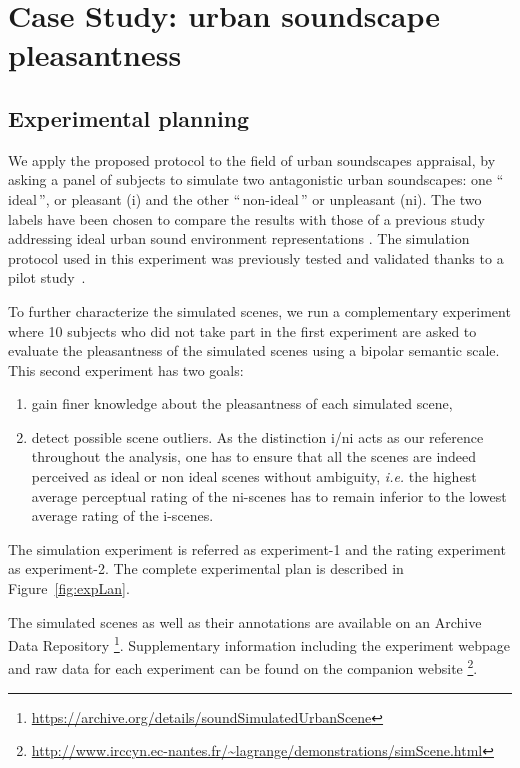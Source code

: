\documentclass[twoside,twocolumn]{article}
\begin{document}

\section{Case Study: urban soundscape pleasantness}
\label{sec:CaseStudyUrbanSoundscape}
\subsection{Experimental planning}

We apply the proposed protocol to the field of urban soundscapes appraisal, by asking a panel of subjects to simulate two antagonistic urban soundscapes:  one ``\,ideal\,'', or pleasant (i) and the other ``\,non-ideal\,'' or unpleasant (ni). The two labels have been chosen to compare the results with those of a previous study addressing ideal urban sound environment representations \cite{guastavino_ideal_2006}. The simulation protocol used in this experiment was previously tested and validated thanks to a pilot study~\cite{soundscape3}.


To further characterize the simulated scenes, we run a complementary experiment where 10 subjects who did not take part in the first experiment are asked to evaluate the pleasantness of the simulated scenes using a bipolar semantic scale. This second experiment has two goals:

\begin{enumerate}
\item gain finer knowledge about the pleasantness of each simulated scene,
\item detect possible scene outliers. As the distinction i/ni acts as our reference throughout the analysis, one has to ensure that all the scenes are indeed perceived as ideal or non ideal scenes without ambiguity, \textit{i.e.} the highest average perceptual rating of the ni-scenes has to remain inferior to the lowest average rating of the i-scenes.
\end{enumerate}

The simulation experiment is referred as experiment-1 and the rating experiment as experiment-2. The complete experimental plan is described in Figure~\ref{fig:expLan}.

The simulated scenes as well as their annotations are available on an Archive Data Repository \footnote{\url{https://archive.org/details/soundSimulatedUrbanScene}}. Supplementary information including the experiment webpage and raw data for each experiment can be found on the companion website \footnote{\url{http://www.irccyn.ec-nantes.fr/~lagrange/demonstrations/simScene.html}}. 
\end{document}
